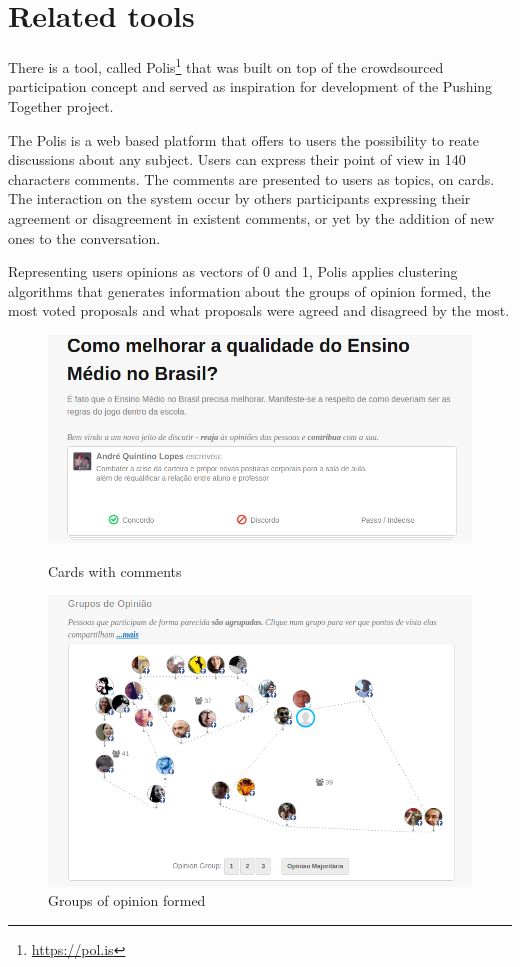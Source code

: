 \documentclass{llncs}
\begin{document}
\section{Related tools}

  There is a tool, called Polis\footnote{\url{https://pol.is}} that was built
  on top of the crowdsourced participation concept and served as inspiration
  for development of the Pushing Together project.

  The Polis is a web based platform that offers to users the possibility to 
  reate discussions about any subject. Users can express their point of view
  in 140 characters comments. The comments are presented to users as topics,
  on cards. The interaction on the system occur by others participants expressing
  their agreement or disagreement in existent comments, or yet by the addition of
  new ones to the conversation.

  Representing users opinions as vectors of 0 and 1, Polis applies clustering algorithms
  that generates information about the groups of opinion formed, the most voted
  proposals and what proposals were agreed and disagreed by the most.

 \begin{figure}[H]
   \centering
   \begin{minipage}{.50\textwidth}
     \includegraphics[width=.9\linewidth]{images/polis1.png}
     \caption{Cards with comments}
     \label{fig:polis-2}
   \end{minipage}
   \begin{minipage}{.49\textwidth}
     \includegraphics[width=.9\linewidth]{images/polis2.png}
     \caption{Groups of opinion formed}
     \label{fig:polis-1}
   \end{minipage}
 \end{figure}
\end{document}
